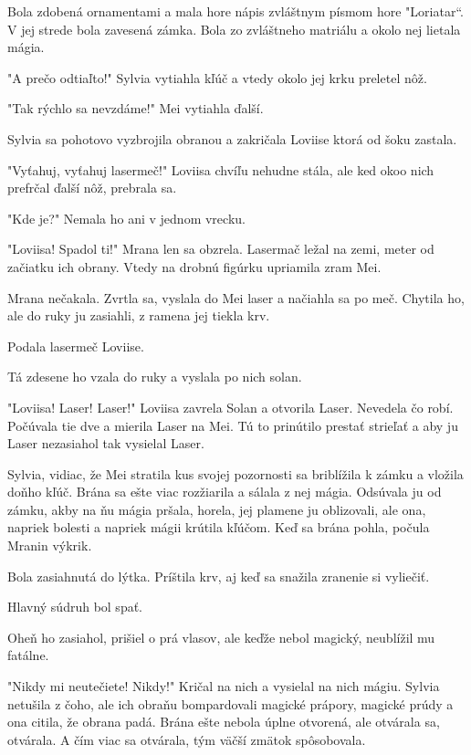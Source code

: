 \documentclass{book}
\begin{document}
Bola zdobená ornamentami a mala hore nápis zvláštnym písmom hore "$ $Loriatar“. V jej strede bola zavesená zámka. Bola zo zvláštneho matriálu a okolo nej lietala mágia.

"$ $A prečo odtiaľto!"$ $ Sylvia vytiahla kľúč a vtedy okolo jej krku preletel nôž.

"$ $Tak  rýchlo sa nevzdáme!"$ $ Mei vytiahla ďalší.

Sylvia sa pohotovo vyzbrojila obranou a zakričala Loviise ktorá od šoku zastala.

"$ $Vyťahuj, vyťahuj lasermeč!"$ $ Loviisa chvíľu nehudne stála, ale ked okoo nich prefrčal ďalší nôž, prebrala sa.

"$ $Kde je?"$ $ Nemala ho ani v jednom vrecku.



"$ $Loviisa! Spadol ti!"$ $ Mrana len sa obzrela. Lasermač ležal na zemi, meter od začiatku ich obrany. Vtedy na drobnú figúrku upriamila zram Mei.

Mrana nečakala. Zvrtla sa, vyslala do Mei laser a načiahla sa po meč. Chytila ho, ale do ruky ju zasiahli, z ramena jej tiekla krv.

Podala lasermeč Loviise.

Tá zdesene ho vzala do ruky a vyslala po nich solan.

"$ $Loviisa! Laser! Laser!"$ $ Loviisa zavrela Solan a otvorila Laser. Nevedela čo robí. Počúvala tie dve a mierila Laser na Mei. Tú to prinútilo prestať strieľať a aby ju Laser nezasiahol tak vysielal Laser.

Sylvia, vidiac, že Mei stratila kus svojej pozornosti sa briblížila k zámku a vložila doňho kľúč. Brána sa ešte viac rozžiarila a sálala z nej mágia.  Odsúvala ju od zámku, akby na ňu mágia pršala, horela, jej plamene ju oblizovali, ale ona, napriek bolesti a napriek mágii krútila kľúčom. Keď sa brána pohla, počula Mranin výkrik.

Bola zasiahnutá do lýtka. Príštila krv, aj keď sa snažila zranenie si vyliečiť.

Hlavný súdruh bol spať.

Oheň ho zasiahol, prišiel o prá vlasov, ale keďže nebol magický, neublížil mu fatálne.

"$ $Nikdy mi neutečiete! Nikdy!"$ $ Kričal na nich a vysielal na nich mágiu. Sylvia netušila z čoho, ale ich obraňu bompardovali magické prápory, magické prúdy a ona citila, že obrana padá. Brána ešte nebola úplne otvorená, ale otvárala sa, otvárala. A čím viac sa otvárala, tým väčší zmätok spôsobovala.
\end{document}
